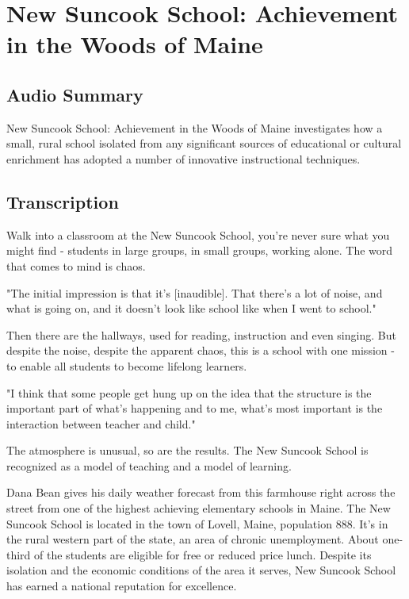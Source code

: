 \section{New Suncook School: Achievement in the Woods of Maine}

\subsection{Audio Summary}

New Suncook School: Achievement in the Woods of Maine investigates how a small, rural school isolated from any significant sources of educational or cultural enrichment has adopted a number of innovative instructional techniques.

\subsection{Transcription}

Walk into a classroom at the New Suncook School, you're never sure what you might find - students in large groups, in small groups, working alone. The word that comes to mind is chaos.

"The initial impression is that it's [inaudible]. That there's a lot of noise, and what is going on, and it doesn't look like school like when I went to school."

Then there are the hallways, used for reading, instruction and even singing. But despite the noise, despite the apparent chaos, this is a school with one mission - to enable all students to become lifelong learners.

"I think that some people get hung up on the idea that the structure is the important part of what's happening and to me, what's most important is the interaction between teacher and child."

The atmosphere is unusual, so are the results. The New Suncook School is recognized as a model of teaching and a model of learning.

Dana Bean gives his daily weather forecast from this farmhouse right across the street from one of the highest achieving elementary schools in Maine. The New Suncook School is located in the town of Lovell, Maine, population 888. It's in the rural western part of the state, an area of chronic unemployment. About one-third of the students are eligible for free or reduced price lunch. Despite its isolation and the economic conditions of the area it serves, New Suncook School has earned a national reputation for excellence.

